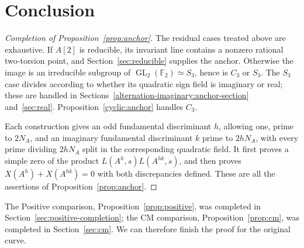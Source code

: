 \section{Conclusion}\label{sec:conclusion}

\begin{proof}[Completion of Proposition~\ref{prop:anchor}]
The residual cases treated above are exhaustive.  If \(A[2]\) is
reducible, its invariant line contains a nonzero rational two-torsion
point, and Section~\ref{sec:reducible} supplies the anchor.  Otherwise
the image is an irreducible subgroup of
\(\operatorname{GL}_2(\mathbb F_2)\simeq S_3\), hence is \(C_3\) or
\(S_3\).  The \(S_3\) case divides according to whether its quadratic
sign field is imaginary or real; these are handled in
Sections~\ref{alternation-imaginary:anchor-section} and~\ref{sec:real}.
Proposition~\ref{cyclic:anchor} handles \(C_3\).

Each construction gives an odd fundamental discriminant \(h\),
allowing one, prime to \(2N_A\), and an imaginary fundamental
discriminant \(k\) prime to \(2hN_A\), with every prime dividing
\(2hN_A\) split in the corresponding quadratic field.  It first
proves a simple zero of the product
\(L(A^h,s)L(A^{hk},s)\), and then proves
\(X(A^h)+X(A^{hk})=0\) with both discrepancies defined.  These are
all the assertions of Proposition~\ref{prop:anchor}.
\end{proof}

The Positive comparison, Proposition~\ref{prop:positive}, was
completed in Section~\ref{sec:positive-completion}; the CM comparison,
Proposition~\ref{prop:cm}, was completed in Section~\ref{sec:cm}.
We can therefore finish the proof for the original curve.


